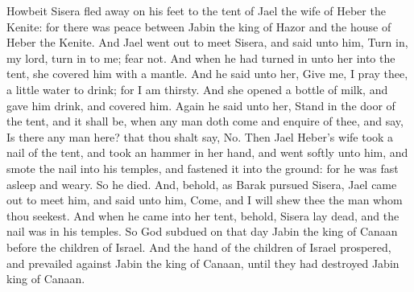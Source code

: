\begin{biblechapter}
\verse Howbeit Sisera fled away on his feet to the tent of Jael the wife of Heber the Kenite: for there was peace between Jabin the king of Hazor and the house of Heber the Kenite.
\verse And Jael went out to meet Sisera, and said unto him, Turn in, my lord, turn in to me; fear not. And when he had turned in unto her into the tent, she covered him with a mantle.
\verse And he said unto her, Give me, I pray thee, a little water to drink; for I am thirsty. And she opened a bottle of milk, and gave him drink, and covered him.
\verse Again he said unto her, Stand in the door of the tent, and it shall be, when any man doth come and enquire of thee, and say, Is there any man here? that thou shalt say, No.
\verse Then Jael Heber's wife took a nail of the tent, and took an hammer in her hand, and went softly unto him, and smote the nail into his temples, and fastened it into the ground: for he was fast asleep and weary. So he died.
\verse And, behold, as Barak pursued Sisera, Jael came out to meet him, and said unto him, Come, and I will shew thee the man whom thou seekest. And when he came into her tent, behold, Sisera lay dead, and the nail was in his temples.
\verse So God subdued on that day Jabin the king of Canaan before the children of Israel.
\verse And the hand of the children of Israel prospered, and prevailed against Jabin the king of Canaan, until they had destroyed Jabin king of Canaan.
\end{biblechapter}

